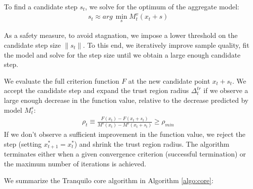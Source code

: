 To find a candidate step $s_t$, we solve for the optimum of the aggregate model:
\begin{align}
    s_t\approx arg\,\min\limits_sM_t^v(x_t+s)
    \label{eq:cand-step}
\end{align}


As a safety measure, to avoid stagnation, we impose a lower threshold on the candidate step size $\lVert s_t\rVert$. To this end, we iteratively improve sample quality, fit the model and solve for the step size until we obtain a large enough candidate step.

We evaluate the full criterion function $F$ at the new candidate point $x_t+s_t$. We accept the candidate step and expand the trust region radius $\Delta_t^{tr}$ if we observe a large enough decrease in the function value, relative to the decrease predicted by model $M_t^s$:
\begin{align}
    \rho_t\equiv\frac{F(x_t)-F(x_t+s_t)}{M^s(x_t)-M^s(x_t+s_t)}\geq\rho_{min}
    \label{eq:rho}
\end{align}
If we don't observe a sufficient improvement in the function value, we reject the step (setting $x^{*}_{t+1}=x_t^{*}$) and shrink the trust region radius. The algorithm terminates either when a given convergence criterion (successful termination) or the maximum number of iterations is achieved.

We summarize the Tranquilo core algorithm in Algorithm \ref{algo:core}:

